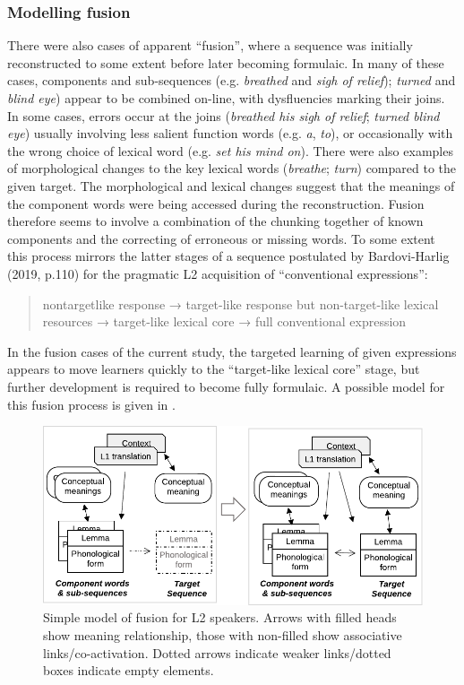 \documentclass[output=paper]{langscibook}
\begin{document}
\subsubsection{Modelling fusion}


There were also cases of apparent ``fusion'', where a sequence was initially reconstructed to some extent before later becoming formulaic. In many of these cases, components and sub-sequences (e.g. \textit{breathed} and \textit{sigh of relief}); \textit{turned} and \textit{blind eye}) appear to be combined on-line, with dysfluencies marking their joins. In some cases, errors occur at the joins (\textit{breathed his sigh of relief}; \textit{turned blind eye}) usually involving less salient function words (e.g. \textit{a}, \textit{to}), or occasionally with the wrong choice of lexical word (e.g. \textit{set his mind on}). There were also examples of morphological changes to the key lexical words (\textit{breathe}; \textit{turn}) compared to the given target. The morphological and lexical changes suggest that the meanings of the component words were being accessed during the reconstruction. Fusion therefore seems to involve a combination of the chunking together of known components and the correcting of erroneous or missing words. To some extent this process mirrors the latter stages of a sequence postulated by Bardovi-Harlig (2019, p.110) for the pragmatic L2 acquisition of ``conventional expressions'': 

\begin{quote}
nontargetlike response → target-like response but non-target-like lexical resources → target-like lexical core → full conventional expression
\end{quote}

In the fusion cases of the current study, the targeted learning of given expressions appears to move learners quickly to the ``target-like lexical core'' stage, but further development is required to become fully formulaic. A possible model for this fusion process is given in .


\begin{figure}
\includegraphics[width=\textwidth]{figures/cutlerFig5.pdf}
\caption{Simple model of fusion for L2 speakers. Arrows with filled heads show meaning relationship, those with non-filled show associative links\slash co-activation. Dotted arrows indicate weaker links\slash dotted boxes indicate empty elements.\label{fig:cutler:5}}
\end{figure}
\end{document}
